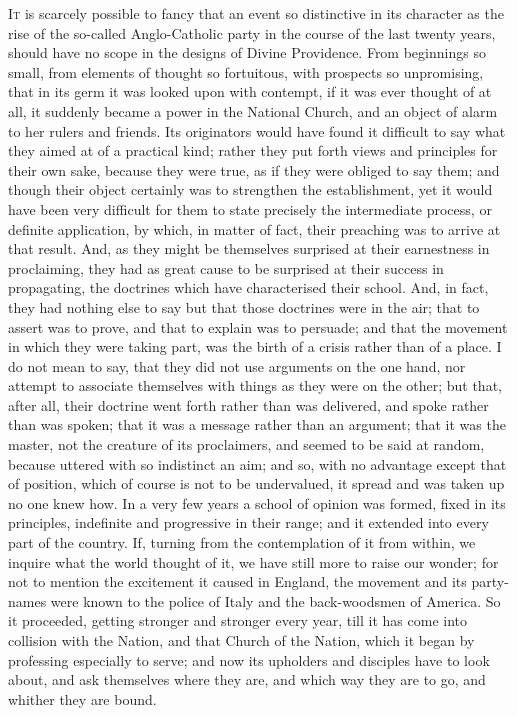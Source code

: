 I\textsc{t} is scarcely possible to fancy that an event so distinctive in
its character as the rise of the so-called Anglo-Catholic party in the
course of the last twenty years, should have no scope in the designs
of Divine Providence. From beginnings so small, from elements of
thought so fortuitous, with prospects so unpromising, that in its germ
it was looked upon with contempt, if it was ever thought of at all, it
suddenly became a power in the National Church, and an object of alarm
to her rulers and friends. Its originators would have found it
difficult to say what they aimed at of a practical kind; rather they
put forth views and principles for their own sake, because they were
true, as if they were obliged to say them; and though their object
certainly was to strengthen the establishment, yet it would have been
very difficult for them to state precisely the intermediate process,
or definite application, by which, in matter of fact, their preaching
was to arrive at that result. And, as they might be themselves
surprised at their earnestness in proclaiming, they had as great cause
to be surprised at their success in propagating, the doctrines which
have characterised their school. And, in fact, they had nothing else
to say but that those doctrines were in the air; that to assert was to
prove, and that to explain was to persuade; and that the movement in
which they were taking part, was the birth of a crisis rather than of
a place. I do not mean to say, that they did not use arguments on the
one hand, nor attempt to associate themselves with things as they were
on the other; but that, after all, their doctrine went forth rather
than was delivered, and spoke rather than was spoken; that it was a
message rather than an argument; that it was the master, not the
creature of its proclaimers, and seemed to be said at random, because
uttered with so indistinct an aim; and so, with no advantage except
that of position, which of course is not to be undervalued, it spread
and was taken up no one knew how. In a very few years a school of
opinion was formed, fixed in its principles, indefinite and
progressive in their range; and it extended into every part of the
country. If, turning from the contemplation of it from within, we
inquire what the world thought of it, we have still more to raise our
wonder; for not to mention the excitement it caused in England, the
movement and its party-names were known to the police of Italy and the
back-woodsmen of America. So it proceeded, getting stronger and
stronger every year, till it has come into collision with the Nation,
and that Church of the Nation, which it began by professing especially
to serve; and now its upholders and disciples have to look about, and
ask themselves where they are, and which way they are to go, and
whither they are bound.

